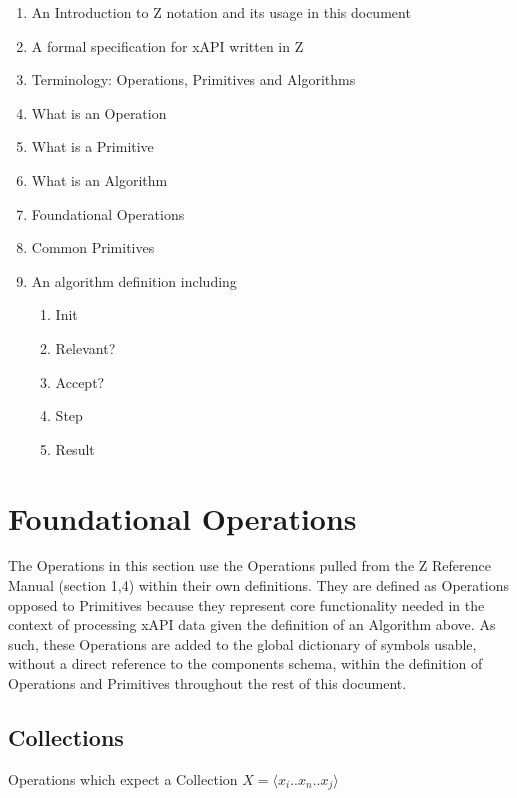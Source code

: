 \documentclass{article}
\begin{document}
\begin{enumerate}
\item An Introduction to Z notation and its usage in this document
\item A formal specification for xAPI written in Z %
\item Terminology: Operations, Primitives and Algorithms
\item What is an Operation
\item What is a Primitive
\item What is an Algorithm
\item Foundational Operations
\item Common Primitives                 %
\item An algorithm definition including %
  \begin{enumerate}
  \item Init
  \item Relevant?
  \item Accept?
  \item Step
  \item Result
  \end{enumerate}
\end{enumerate}





\section{Foundational Operations}
The Operations in this section use the Operations pulled from the Z Reference Manual (section 1,4) within their own definitions.
They are defined as Operations opposed to Primitives because they represent core functionality needed in the context
of processing xAPI data given the definition of an Algorithm above. As such, these Operations are added to the global
dictionary of symbols usable, without a direct reference to the components schema,
within the definition of Operations and Primitives throughout the rest of this document.

\subsection{Collections}
Operations which expect a Collection $X = \langle x_{i}..x_{n}..x_{j} \rangle$





\end{document}
